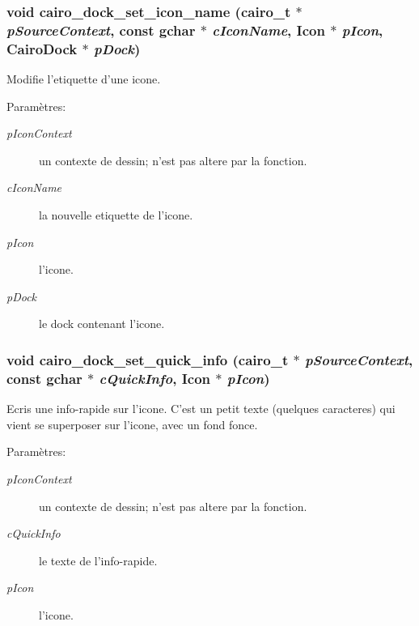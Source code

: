 \subsubsection{\setlength{\rightskip}{0pt plus 5cm}void cairo\_\-dock\_\-set\_\-icon\_\-name (cairo\_\-t $\ast$ {\em p\-Source\-Context}, const gchar $\ast$ {\em c\-Icon\-Name}, {\bf Icon} $\ast$ {\em p\-Icon}, {\bf Cairo\-Dock} $\ast$ {\em p\-Dock})}\label{cairo-dock-applet-factory_8c_e43c71f687d8b0042dfe38830fe4f15e}


Modifie l'etiquette d'une icone. \begin{Desc}
\item[Param\`{e}tres:]
\begin{description}
\item[{\em p\-Icon\-Context}]un contexte de dessin; n'est pas altere par la fonction. \item[{\em c\-Icon\-Name}]la nouvelle etiquette de l'icone. \item[{\em p\-Icon}]l'icone. \item[{\em p\-Dock}]le dock contenant l'icone. \end{description}
\end{Desc}
\subsubsection{\setlength{\rightskip}{0pt plus 5cm}void cairo\_\-dock\_\-set\_\-quick\_\-info (cairo\_\-t $\ast$ {\em p\-Source\-Context}, const gchar $\ast$ {\em c\-Quick\-Info}, {\bf Icon} $\ast$ {\em p\-Icon})}\label{cairo-dock-applet-factory_8c_08c39505bfe2941f34391c1c8614b6bc}


Ecris une info-rapide sur l'icone. C'est un petit texte (quelques caracteres) qui vient se superposer sur l'icone, avec un fond fonce. \begin{Desc}
\item[Param\`{e}tres:]
\begin{description}
\item[{\em p\-Icon\-Context}]un contexte de dessin; n'est pas altere par la fonction. \item[{\em c\-Quick\-Info}]le texte de l'info-rapide. \item[{\em p\-Icon}]l'icone. \end{description}
\end{Desc}
